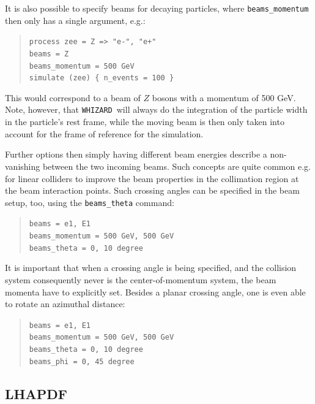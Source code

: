 \documentclass[12pt]{book}
\newcommand{\ttt}[1]{\texttt{#1}}
\newcommand{\whizard}{\ttt{WHIZARD}}
\begin{document}
It is also possible to specify beams for decaying particles, where
\ttt{beams\_momentum} then only has a single argument, e.g.:
\begin{quote}
\begin{footnotesize}
  \ttt{process zee = Z => "e-", "e+"} \\
  \ttt{beams = Z} \\
  \ttt{beams\_momentum = 500 GeV} \\
  \ttt{simulate (zee) \{ n\_events = 100 \} }
\end{footnotesize}
\end{quote}
This would correspond to a beam of $Z$ bosons with a momentum of 500
GeV. Note, however, that \whizard\ will always do the integration of
the particle width in the particle's rest frame, while the moving beam
is then only taken into account for the frame of reference for the
simulation.

Further options then simply having different beam energies describe a
non-vanishing between the two incoming beams. Such concepts are quite
common e.g. for linear colliders to improve the beam properties in the
collimation region at the beam interaction points. Such crossing
angles can be specified in the beam setup, too, using the
\ttt{beams\_theta} command:
\begin{quote}
\begin{footnotesize}
  \ttt{beams = e1, E1} \\
  \ttt{beams\_momentum = 500 GeV, 500 GeV} \\
  \ttt{beams\_theta = 0, 10 degree}
\end{footnotesize}
\end{quote}
It is important that when a crossing angle is being specified, and the
collision system consequently never is the center-of-momentum system,
the beam momenta have to explicitly set. Besides a planar crossing
angle, one is even able to rotate an azimuthal distance:
\begin{quote}
\begin{footnotesize}
  \ttt{beams = e1, E1} \\
  \ttt{beams\_momentum = 500 GeV, 500 GeV} \\
  \ttt{beams\_theta = 0, 10 degree} \\
  \ttt{beams\_phi = 0, 45 degree}
\end{footnotesize}
\end{quote}


\subsection{LHAPDF}
\label{sec:lhapdf}
\end{document}
